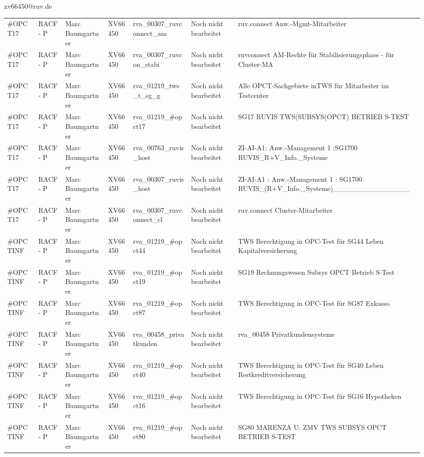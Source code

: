 \documentclass[a4paper,landscape,12pt]{letter}
\begin{document}
\begin{letter}{xv66450@ruv.de\hfill \break}
\begin{tiny}
\begin{longtable}{|p{35mm}|p{15mm}|p{25mm}|p{10mm}|p{40mm}|p{50mm}|p{50mm}|}
\#OPCT17 & RACF - P & Marc Baumgartner & XV66450 & rva\_00307\_ruvconnect\_am & Noch nicht bearbeitet & ruv.connect Anw.-Mgmt-Mitarbeiter \\
\#OPCT17 & RACF - P & Marc Baumgartner & XV66450 & rva\_00307\_ruvcon\_stabi & Noch nicht bearbeitet & ruvconnect AM-Rechte für Stabilisierungsphase - für Cluster-MA \\
\#OPCT17 & RACF - P & Marc Baumgartner & XV66450 & rva\_01219\_tws\_t\_sg\_g & Noch nicht bearbeitet & Alle OPCT-Sachgebiete inTWS für Mitarbeiter im Testcenter \\
\#OPCT17 & RACF - P & Marc Baumgartner & XV66450 & rva\_01219\_\#opct17 & Noch nicht bearbeitet & SG17 RUVIS TWS(SUBSYS(OPCT) BETRIEB S-TEST \\
\#OPCT17 & RACF - P & Marc Baumgartner & XV66450 & rva\_00763\_ruvis\_host & Noch nicht bearbeitet & ZI-AI-A1: Anw.-Management 1 :SG1700 RUVIS\_R+V\_Info.\_Systeme \\
\#OPCT17 & RACF - P & Marc Baumgartner & XV66450 & rva\_00307\_ruvis\_host & Noch nicht bearbeitet & ZI-AI-A1   : Anw.-Management 1 : SG1700 RUVIS\_(R+V\_Info.\_Systeme)\_\_\_\_\_\_\_\_\_\_\_\_\_\_\_ \\
\#OPCT17 & RACF - P & Marc Baumgartner & XV66450 & rva\_00307\_ruvconnect\_cl & Noch nicht bearbeitet & ruv.connect Cluster-Mitarbeiter \\
\#OPCTINF & RACF - P & Marc Baumgartner & XV66450 & rva\_01219\_\#opct44 & Noch nicht bearbeitet & TWS Berechtigung in OPC-Test für SG44 Leben Kapitalversicherung \\
\#OPCTINF & RACF - P & Marc Baumgartner & XV66450 & rva\_01219\_\#opct19 & Noch nicht bearbeitet & SG19 Rechnungswesen Subsys OPCT Betrieb S-Test \\
\#OPCTINF & RACF - P & Marc Baumgartner & XV66450 & rva\_01219\_\#opct87 & Noch nicht bearbeitet & TWS Berechtigung in OPC-Test für SG87 Exkasso \\
\#OPCTINF & RACF - P & Marc Baumgartner & XV66450 & rva\_00458\_privatkunden & Noch nicht bearbeitet & rva\_00458 Privatkundensysteme \\
\#OPCTINF & RACF - P & Marc Baumgartner & XV66450 & rva\_01219\_\#opct40 & Noch nicht bearbeitet & TWS Berechtigung in OPC-Test für SG40 Leben Restkreditversicherung \\
\#OPCTINF & RACF - P & Marc Baumgartner & XV66450 & rva\_01219\_\#opct16 & Noch nicht bearbeitet & TWS Berechtigung in OPC-Test für SG16 Hypotheken \\
\#OPCTINF & RACF - P & Marc Baumgartner & XV66450 & rva\_01219\_\#opct80 & Noch nicht bearbeitet & SG80 MARENZA U. ZMV TWS SUBSYS OPCT BETRIEB S-TEST \\

\end{longtable}
\end{tiny}
\end{letter}
\end{document}
